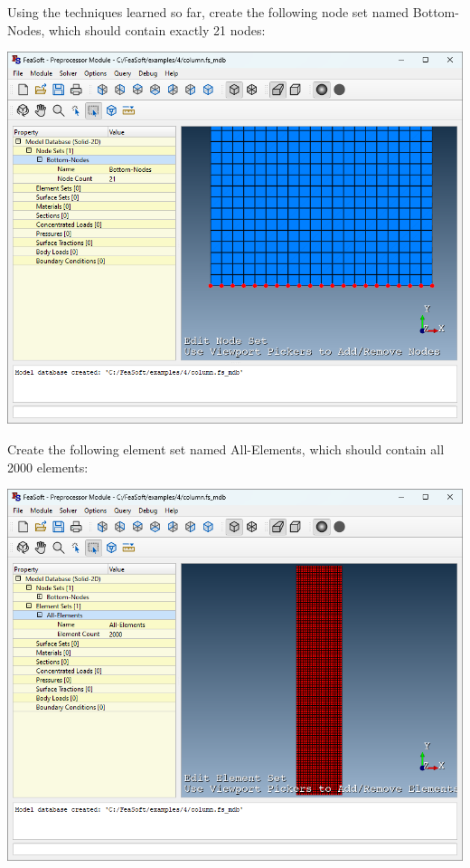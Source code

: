 \documentclass[
    11pt,        %
    a4paper,     %
    final,       %
    fleqn,       %
    notitlepage, %
    onecolumn,   %
    oneside,     %
]{article}
\begin{document}
Using the techniques learned so far, create the following node set named Bottom-Nodes, which should contain exactly 21 nodes:
\begin{center}
    \includegraphics[scale=0.5]{fig/ui-4-2.png}
\end{center}

Create the following element set named All-Elements, which should contain all 2000 elements:
\begin{center}
    \includegraphics[scale=0.5]{fig/ui-4-3.png}
\end{center}
\end{document}
